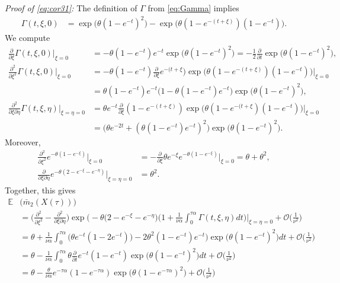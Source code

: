 \documentclass{imsart}
\theoremstyle{plain}
\theoremstyle{definition}
\begin{document}
\noindent\emph{Proof of \eqref{eq:cor31}:}
The definition of $\Gamma$ from \eqref{eq:Gamma} implies
\begin{align*}
\Gamma(t, \xi, 0) & = \exp\Big(\theta(1 - e^{-t})^2 \Big) - \exp\Big(\theta(1 - e^{- (t + \xi)})(1 - e^{-t}) \Big).
\end{align*}
We compute
\begin{align*}
    \frac{\partial}{\partial \xi} \Gamma(t,\xi, 0)\Big|_{\xi=0} & = - \theta (1 - e^{-t}) e^{-t} \exp\Big(\theta(1 - e^{- t})^2 \Big) = - \frac 12 \frac{\partial}{\partial t} \exp\Big(\theta(1 - e^{-t})^2\Big), \\
    \frac{\partial^2}{\partial \xi^2} \Gamma(t,\xi, 0)\Big|_{\xi=0} & = - \theta (1 - e^{-t}) \frac{\partial}{\partial\xi} e^{-(t + \xi}) \exp\Big(\theta(1 - e^{- (t + \xi)})(1 - e^{-t}) \Big) \Big|_{\xi=0} \\ & = \theta(1 - e^{-t}) e^{-t} \Big(1 - \theta( 1 - e^{-t})e^{-t} \Big)\exp\Big(\theta(1 - e^{- t})^2 \Big), \\
    \frac{\partial^2}{\partial \xi \partial\eta} \Gamma(t,\xi,\eta)\Big|_{\xi=\eta=0} & = \theta e^{-t}\frac{\partial}{\partial \xi} (1 - e^{-(t + \xi)}) \exp\Big( \theta(1 - e^{-(t + \xi})(1 - e^{-t})\Big)\Big|_{\xi = 0} \\ & = 
    \big(\theta e^{-2t} + (\theta(1 - e^{-t})e^{-t})^2\big) \exp\Big(\theta(1 - e^{- t})^2 \Big).
\end{align*}
Moreover, 
\begin{align*}
    \frac{\partial^2}{\partial\xi^2} e^{-\theta(1- e^{-\xi})}\Big|_{\xi = 0} & = - \frac{\partial}{\partial\xi} \theta e^{-\xi} e^{-\theta(1- e^{-\xi})}\Big|_{\xi = 0} = \theta + \theta^2,\\
    \frac{\partial}{\partial\xi \partial\eta} e^{-\theta(2- e^{-\xi} - e^{-\eta})}\Big|_{\xi = \eta = 0} & = \theta^2. 
\end{align*}
Together, this gives
\begin{align*}
    \mathbb E&\big(\bar m_2(X(\tau))\big) \\ & = \Big(\frac{\partial^2}{\partial\xi^2} - \frac{\partial^2}{\partial\xi \partial \eta}\Big) \exp\Big( \!-\theta(2 - e^{-\xi} - e^{-\eta}\Big)\Big(1 + \frac{1}{\nu \alpha} \int_0^{\tau\alpha} \Gamma(t, \xi, \eta) dt \Big)\Big|_{\xi = \eta = 0} \!\! + \mathcal O\Big(\frac{1}{\nu^2}\Big) \\ & = \theta + \frac{1}{\nu \alpha} \int_0^{\tau\alpha} \big( \theta e^{-t}(1 - 2e^{-t})) - 2\theta^2(1 - e^{-t})e^{-t} \big)\exp\Big(\theta(1 - e^{-t})^2 \Big) dt  + \mathcal O\Big(\frac{1}{\nu^2}\Big) \\ & = \theta - \frac{1}{\nu \alpha} \int_0^{\tau \alpha} \theta \frac{\partial}{\partial t} e^{-t}(1 - e^{-t}) \exp\Big(\theta(1 - e^{-t})^2 \Big) dt + \mathcal O\Big(\frac{1}{\nu^2}\Big)\\ & = \theta - \frac{\theta}{\nu \alpha}e^{-\tau\alpha}(1 - e^{-\tau\alpha}) \exp\Big(\theta(1 - e^{-\tau\alpha})^2 \Big) + \mathcal O\Big(\frac{1}{\nu^2}\Big)
\end{align*}
\end{document}
